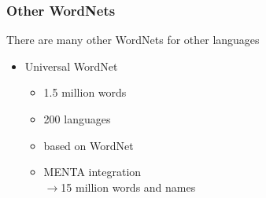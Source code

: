 \begin{frame}
\frametitle{Other WordNets}
There are many other WordNets for other languages
\begin{itemize}
\item Universal WordNet
\begin{itemize}
\item 1.5 million words
\item 200 languages
\item based on WordNet
\item MENTA integration\\
$\rightarrow$15 million words and names
\end{itemize}
\end{itemize}
\end{frame}